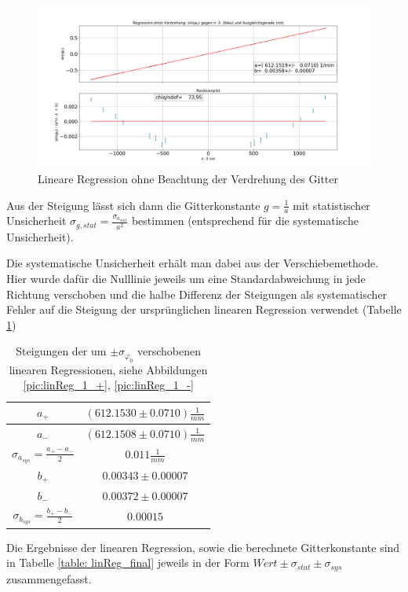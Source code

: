 \documentclass[a4paper, 11pt]{article}
\begin{document}
\textwidth
\begin{figure}[H]
	\hskip-2.5cm
	\includegraphics[scale=0.45]{./Bilder/Gitter_Regression_ohne_Verdrehung.png}
	\caption{Lineare Regression ohne Beachtung der Verdrehung des Gitter}
	\label{pic:linReg_1}	
\end{figure}

Aus der Steigung lässt sich dann die Gitterkonstante $g = \frac{1}{a}$ mit statistischer Unsicherheit $ \sigma_{g, stat} = \frac{\sigma_{a_{stat}}}{a^2}$ bestimmen (entsprechend für die systematische Unsicherheit).  

Die systematische Unsicherheit erhält man dabei aus der Verschiebemethode. Hier wurde dafür die Nulllinie jeweils um eine Standardabweichung in jede Richtung verschoben und die halbe Differenz der Steigungen als systematischer Fehler auf die Steigung der ursprünglichen linearen Regression verwendet (Tabelle \ref{table: aSys})
\begin{table}[H]
	\renewcommand{\arraystretch}{1.5}
	\large
	\centering
	\begin{tabular}{|c|c|}
		\hline
		$a_+$	&	$(612.1530 \pm 0.0710) \frac{1}{mm}$ \\
		\hline
		$a_-$	&	$(612.1508 \pm 0.0710) \frac{1}{mm}$ \\
		\hline
		$\sigma_{a_{sys}} = \frac{a_+ - a_-}{2}$	&	$ 0.011 \frac{1}{mm} $ \\
		\hline
		$b_+$	&	$0.00343 \pm 0.00007$ \\
		\hline
		$b_-$	&	$0.00372 \pm 0.00007$ \\
		\hline
		$\sigma_{b_{sys}} = \frac{b_+ - b_-}{2}$	&	$ 0.00015 $ \\
		\hline
	\end{tabular}
	\caption{Steigungen der um $\pm \sigma_{\varphi_0}$ verschobenen linearen Regressionen, siehe Abbildungen \ref{pic:linReg_1_+}, \ref{pic:linReg_1_-}}
	\label{table: aSys}
\end{table}
Die Ergebnisse der linearen Regression, sowie die berechnete Gitterkonstante sind in Tabelle \ref{table: linReg_final} jeweils in der Form $Wert \pm \sigma_{stat} \pm \sigma_{sys}$ zusammengefasst.
\end{document}
